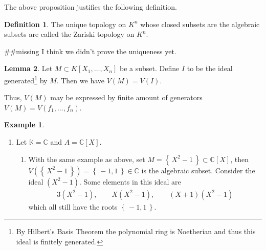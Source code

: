 \documentclass[a4paper]{book}
\theoremstyle{definition}
\newtheorem{definition}{Definition}[]
\newtheorem{example}{Example}[definition]
\newtheorem{lemma}[definition]{Lemma}
\newcommand{\set}[1]{\left\{\, #1 \,\right\}}
\begin{document}
The above proposition justifies the following definition.

\begin{defbox}
    \begin{definition}
        The unique topology on \(K^n\) whose closed subsets are the algebraic subsets are called the Zariski topology on \(K^n\).
    \end{definition}
\end{defbox}

\#\#missing I think we didn't prove the uniqueness yet.
\begin{thmbox}    
    \begin{lemma}
        Let \(M \subset K[X_1, \ldots, X_n]\) be a subset. Define \(I\) to be the ideal generated\footnote{By Hilbert's Basis Theorem the polynomial ring is Noetherian and thus this ideal is finitely generated.} by \(M\). Then we have \(V(M) = V(I)\).
    \end{lemma}
\end{thmbox}
Thus, \(V(M)\) may be expressed by finite amount of generators \(V(M) = V(f_1, \ldots, f_n)\).
\begin{example}
    \begin{enumerate}
        \item Let \(\mathbb{K} = \mathbb{C}\) and \(A = \mathbb{C}[X]\).
        \begin{enumerate}
            \item With the same example as above, set \(M = \set{X^2 - 1} \subset \mathbb{C}[X]\), then \(V(\set{X^2 - 1}) = \set{-1, 1} \in \mathbb{C}\) is the algebraic subset. Consider the ideal \((X^2 - 1)\). Some elements in this ideal are
            \begin{align*}
                3 (X^2 - 1), \qquad X(X^2 - 1), \qquad (X + 1)(X^2 - 1)
            \end{align*}
            which all still have the roots \(\set{-1, 1}\).
        \end{enumerate}
    \end{enumerate}
\end{example}
\end{document}
